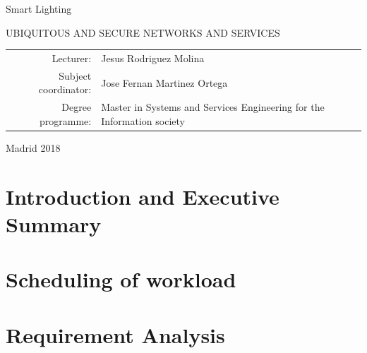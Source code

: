 \documentclass[UKenglish,10pt,a4paper]{report}
\let\openright=\clearpage
\begin{document}
\begin{titlepage}
\begin{center}
\vspace{10mm}

{\LARGE\bfseries } Smart Lighting

\vfill

UBIQUITOUS AND SECURE NETWORKS AND SERVICES

\vfill

\begin{tabular}{rl}

Lecturer: & Jesus Rodriguez Molina  \\
\noalign{\vspace{2mm}}
Subject coordinator: & Jose Fernan Martinez Ortega \\
\noalign{\vspace{2mm}}
Degree programme: & Master in Systems and Services Engineering for the Information society \\
\end{tabular}

\vfill

Madrid 2018

\end{center}
\end{titlepage}
\newpage



\openright

\noindent






\openright
\pagestyle{plain}
\setcounter{page}{1}
\tableofcontents



\chapter{Introduction and Executive Summary}
\chapter{Scheduling of workload}
\chapter{Requirement Analysis}
\end{document}
